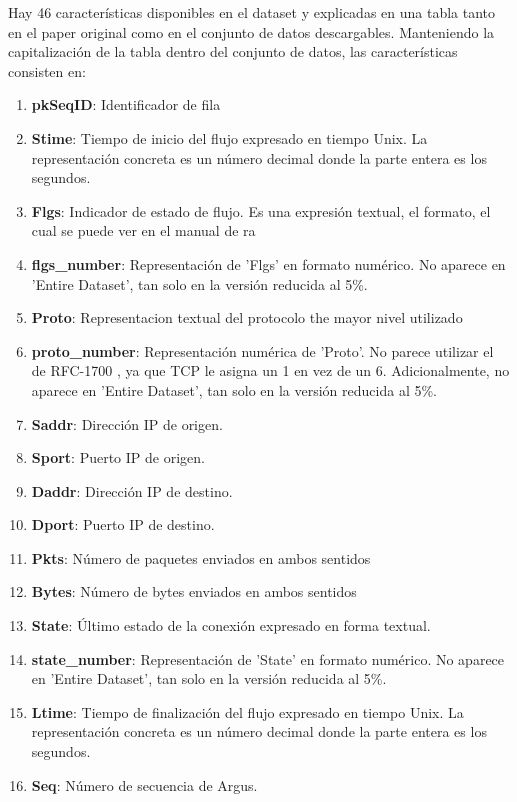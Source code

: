 Hay 46 características disponibles en el dataset y explicadas en una tabla tanto en el paper original como en el conjunto de datos descargables. Manteniendo la capitalización de la tabla dentro del conjunto de datos, las características consisten en:

\begin{enumerate}
    \item \textbf{pkSeqID}: Identificador de fila
    \item \textbf{Stime}: Tiempo de inicio del flujo expresado en tiempo Unix. La representación concreta es un número decimal donde la parte entera es los segundos.
    \item \textbf{Flgs}: Indicador de estado de flujo. Es una expresión textual, el formato, el cual se puede ver en el manual de ra \cite{ratool}
    \item \textbf{flgs\_number}: Representación de 'Flgs' en formato numérico. No aparece en 'Entire Dataset', tan solo en la versión reducida al 5\%.
    \item \textbf{Proto}: Representacion textual del protocolo the mayor nivel utilizado
    \item \textbf{proto\_number}: Representación numérica de 'Proto'. No parece utilizar el de RFC-1700 \cite{rfc1700}, ya que TCP le asigna un 1 en vez de un 6. Adicionalmente, no aparece en 'Entire Dataset', tan solo en la versión reducida al 5\%.
    \item \textbf{Saddr}: Dirección IP de origen.
    \item \textbf{Sport}: Puerto IP de origen.
    \item \textbf{Daddr}: Dirección IP de destino.
    \item \textbf{Dport}: Puerto IP de destino.
    \item \textbf{Pkts}: Número de paquetes enviados en ambos sentidos
    \item \textbf{Bytes}: Número de bytes enviados en ambos sentidos
    \item \textbf{State}: Último estado de la conexión expresado en forma textual.
    \item \textbf{state\_number}: Representación de 'State' en formato numérico. No aparece en 'Entire Dataset', tan solo en la versión reducida al 5\%.
    \item \textbf{Ltime}: Tiempo de finalización del flujo expresado en tiempo Unix. La representación concreta es un número decimal donde la parte entera es los segundos.
    \item \textbf{Seq}: Número de secuencia de Argus.

\end{enumerate}
